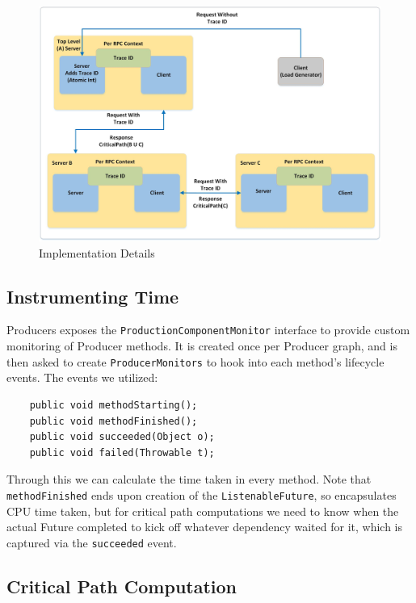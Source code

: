 \documentclass[11pt, twoside, twocolumn]{extarticle}
\begin{document}
\begin{figure}[h]
\centering
\includegraphics[width=\linewidth]{implementation.jpg}
\caption[width=\linewidth]{Implementation Details}
\label{implementation}
\end{figure}
    
\subsection{Instrumenting Time}

Producers exposes the \lstinline{ProductionComponentMonitor} interface to provide custom monitoring of Producer methods. It is created once per Producer graph, and is then asked to create \lstinline{ProducerMonitors} to hook into each method's lifecycle events. The events we utilized:
\begin{lstlisting}
    public void methodStarting();
    public void methodFinished();
    public void succeeded(Object o);
    public void failed(Throwable t);
\end{lstlisting}
Through this we can calculate the time taken in every method. Note that \lstinline{methodFinished} ends upon creation of the \lstinline{ListenableFuture}, so encapsulates CPU time taken, but for critical path computations we need to know when the actual Future completed to kick off whatever dependency waited for it, which is captured via the \lstinline{succeeded} event.

\subsection{Critical Path Computation}
\end{document}
